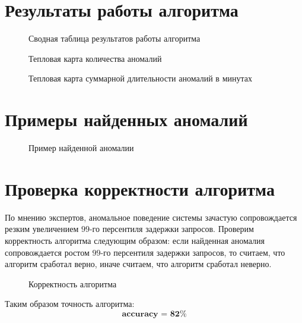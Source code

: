 \documentclass[14pt, a4paper]{extarticle}
\begin{document}
	
	\section{Результаты работы алгоритма}	
	\begin{figure}[H]
		\centerline{} 
		\caption{Сводная таблица результатов работы алгоритма}
		\label{target_metric_fig1}
	\end{figure} 
	\begin{figure}[H]
		\centerline{} 
		\caption{Тепловая карта количества аномалий}
		\label{target_metric_fig1}
	\end{figure} 
	\begin{figure}[H]
		\centerline{} 
		\caption{Тепловая карта суммарной длительности аномалий в минутах}
		\label{target_metric_fig1}
	\end{figure} 

	 \section{Примеры найденных аномалий}	
\begin{figure}[H]
		\centerline{} 
		\caption{Пример найденной аномалии}
		\label{target_metric_fig1}
	\end{figure} 
	
	\section{Проверка корректности алгоритма}	
 По мнению экспертов, аномальное поведение системы зачастую сопровождается резким увеличением $99$-го персентиля задержки запросов. Проверим корректность алгоритма следующим образом: если найденная аномалия сопровождается ростом $99$-го персентиля задержки запросов, то считаем, что алгоритм сработал верно, иначе считаем, что алгоритм сработал неверно. 
	\begin{figure}[H]
		\centerline{} 
		\caption{Корректность алгоритма}
		\label{target_metric_fig1}
	\end{figure} 
	Таким образом точность алгоритма: 
	$$\textbf{accuracy = 82\%}$$
	\newpage
\end{document}
